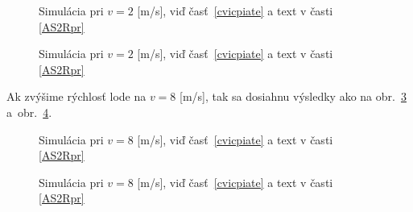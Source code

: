 \documentclass[a4paper, 10pt, ]{article}
\begin{document}
\begin{figure}[t]
	\centering


	\caption{Simulácia pri $v = 2$ [m/s], viď časť~\ref{cvicpiate} a text v časti \ref{AS2Rpr}}
	\label{fig_tex_03_3}

\end{figure}

\begin{figure}[t]
	\centering


	\caption{Simulácia pri $v = 2$ [m/s], viď časť~\ref{cvicpiate} a text v časti \ref{AS2Rpr}}
	\label{fig_tex_04_4}

\end{figure}








Ak zvýšime rýchlosť lode na $v = 8$ [m/s], tak sa dosiahnu výsledky ako na obr.~\ref{fig_tex_03_5} a~obr.~\ref{fig_tex_04_6}.







\begin{figure}[t]
	\centering


	\caption{Simulácia pri $v = 8$ [m/s], viď časť~\ref{cvicpiate} a text v časti \ref{AS2Rpr}}
	\label{fig_tex_03_5}

\end{figure}

\begin{figure}[t]
	\centering


	\caption{Simulácia pri $v = 8$ [m/s], viď časť~\ref{cvicpiate} a text v časti \ref{AS2Rpr}}
	\label{fig_tex_04_6}

\end{figure}
\end{document}
